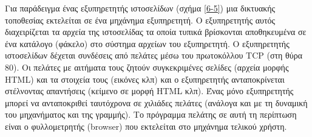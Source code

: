 Για παράδειγμα ένας εξυπηρετητής ιστοσελίδων (σχήμα \ref{6-5}) μια δικτυακής τοποθεσίας εκτελείται σε ένα μηχάνημα εξυπηρετητή. Ο εξυπηρετητής αυτός διαχειρίζεται τα αρχεία της ιστοσελίδας τα οποία τυπικά βρίσκονται αποθηκευμένα σε ένα κατάλογο (φάκελο) στο σύστημα αρχείων του εξυπηρετητή. Ο εξυπηρετητής ιστοσελίδων δέχεται συνδέσεις από πελάτες μέσω του πρωτοκόλλου TCP (στη θύρα 80). Οι πελάτες με αιτήματα τους ζητούν συγκεκριμένες σελίδες (αρχεία μορφής HTML) και τα στοιχεία τους (εικόνες κλπ) και ο εξυπηρετητής ανταποκρίνεται στέλνοντας απαντήσεις (κείμενο σε μορφή HTML κλπ).  Ένας μόνο εξυπηρετητής μπορεί να ανταποκριθεί ταυτόχρονα σε χιλιάδες πελάτες (ανάλογα και με τη δυναμική του μηχανήματος και της γραμμής). Το πρόγραμμα πελάτης σε αυτή τη περίπτωση είναι ο φυλλομετρητής (browser) που εκτελείται στο μηχάνημα τελικού χρήστη. 